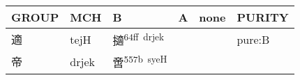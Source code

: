 \documentclass[14pt,a4paper]{scrartcl}
\begin{document}
\begin{longtable}[c]{@{}llllll@{}}
\toprule
\begin{minipage}[b]{0.14\columnwidth}\raggedright\strut
GROUP
\strut\end{minipage} &
\begin{minipage}[b]{0.14\columnwidth}\raggedright\strut
MCH
\strut\end{minipage} &
\begin{minipage}[b]{0.14\columnwidth}\raggedright\strut
B
\strut\end{minipage} &
\begin{minipage}[b]{0.14\columnwidth}\raggedright\strut
A
\strut\end{minipage} &
\begin{minipage}[b]{0.14\columnwidth}\raggedright\strut
none
\strut\end{minipage} &
\begin{minipage}[b]{0.14\columnwidth}\raggedright\strut
PURITY
\strut\end{minipage}\tabularnewline
\midrule
\endhead
\begin{minipage}[t]{0.14\columnwidth}\raggedright\strut
適
\strut\end{minipage} &
\begin{minipage}[t]{0.14\columnwidth}\raggedright\strut
tejH
\strut\end{minipage} &
\begin{minipage}[t]{0.14\columnwidth}\raggedright\strut
擿\textsuperscript{64ff~drjek}
\strut\end{minipage} &
\begin{minipage}[t]{0.14\columnwidth}\raggedright\strut
\strut\end{minipage} &
\begin{minipage}[t]{0.14\columnwidth}\raggedright\strut
\strut\end{minipage} &
\begin{minipage}[t]{0.14\columnwidth}\raggedright\strut
pure:B
\strut\end{minipage}\tabularnewline
\begin{minipage}[t]{0.14\columnwidth}\raggedright\strut
帝
\strut\end{minipage} &
\begin{minipage}[t]{0.14\columnwidth}\raggedright\strut
drjek
\strut\end{minipage} &
\begin{minipage}[t]{0.14\columnwidth}\raggedright\strut
啻\textsuperscript{557b~syeH}
\strut\end{minipage} &

\end{longtable}
\end{document}
